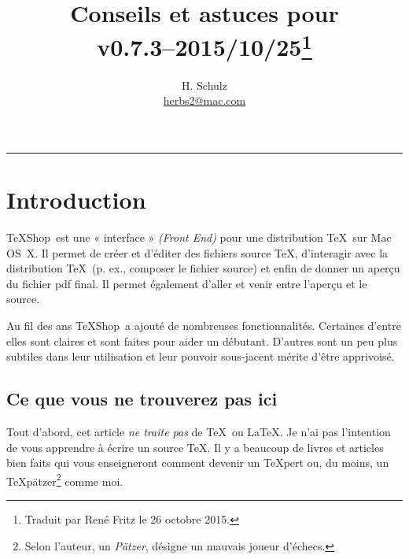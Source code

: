\documentclass[11pt,french]{article}
\title{Conseils et astuces pour \TS\\\small v0.7.3--2015/10/25\thanks{Traduit par René Fritz le 26 octobre 2015.}}
\author{H. Schulz\\\small\href{mailto:herbs2@mac.com}{herbs2@mac.com}}
\date{}
\newcommand{\TS}{\textsf{\TeX Shop}}
\newcommand{\acr}[1]{\textsf{#1}}
\begin{document}
\maketitle

\tableofcontents

\begin{center}
\rule{0.5\textwidth}{1pt}
\end{center}

\section{Introduction}

\TS\ est une « interface » \emph{(Front End)} pour une distribution \TeX\ sur Mac OS~X. Il permet de créer et d'éditer des fichiers source \TeX{}, d'interagir avec la distribution \TeX\ (p. ex., composer le fichier source) et enfin de donner un aperçu du fichier \acr{pdf} final. Il permet également d'aller et venir entre l'aperçu et le source.


Au fil des ans \TS\ a ajouté de nombreuses fonctionnalités. Certaines d'entre elles sont claires et sont faites pour aider un débutant. D'autres sont un peu plus subtiles dans leur utilisation et leur pouvoir sous-jacent mérite d'être apprivoisé.


\subsection{Ce que vous ne trouverez pas ici}

Tout d'abord, cet article \emph{ne traite pas} de \TeX\ ou \LaTeX. Je n'ai pas l'intention de vous apprendre à écrire un source \TeX{}. Il y a beaucoup de livres et articles bien faits qui vous enseigneront comment devenir un \TeX pert ou, du moins, un \TeX pätzer\footnote{Selon l'auteur, un \emph{Pätzer}, désigne un mauvais joueur d'échecs.} comme moi.
 
\end{document}
